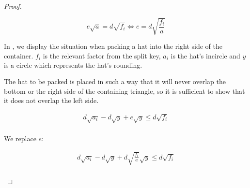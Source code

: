 \documentclass[%
    a4paper,              %
    style=screen,          %
    bibliography=totoc,   %
    nexus,                %
    lnum,                 %
    extramargin,          %
]{tubsbook}
\newcommand\defaulta{30}
\newcommand\defaultb{40}
\newcommand\defaultx{0.6}
\begin{document}
\begin{proof}
\begin{itemize}
            $$e\sqrt{a} = d\sqrt{f_i} \iff e = d\sqrt{\frac{f_i}{a}}$$


            \begin{figure}[htbp!]
                \centering


                \caption{}
                \label{fig:hatpokef}
            \end{figure}

            In , we display the situation when packing a hat into the right side of the container. $f_i$ is the relevant factor from the split key, $a_i$ is the hat's incircle and $y$ is a circle which represents the hat's rounding.

            \begin{figure}[htbp!]
                \centering


                \caption{}
                \label{fig:hatpoke}
            \end{figure}

            The hat to be packed is placed in such a way that it will never overlap the bottom or the right side of the containing triangle, so it is sufficient to show that it does not overlap the left side.

            \begin{align*}
                d\sqrt{a_i} - d\sqrt{y} + e\sqrt{y} \le d\sqrt{f_i}\\
            \end{align*}

            We replace $e$:

            \begin{align*}
                d\sqrt{a_i} - d\sqrt{y} + d\sqrt{\frac{f_i}{a}}\sqrt{y} \le d\sqrt{f_i}\\
            \end{align*}


\end{itemize}
\end{proof}
\end{document}
